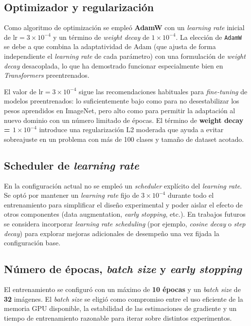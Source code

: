 \subsection{Optimizador y regularización}

Como algoritmo de optimización se empleó \textbf{AdamW} con un \textit{learning rate} inicial de $\text{lr} = 3 \times 10^{-4}$ y un término de \textit{weight decay} de $1 \times 10^{-4}$. La elección de \texttt{AdamW} se debe a que combina la adaptatividad de Adam (que ajusta de forma independiente el \textit{learning rate} de cada parámetro) con una formulación de \textit{weight decay} desacoplada, lo que ha demostrado funcionar especialmente bien en \textit{Transformers} preentrenados.

El valor de $\text{lr} = 3 \times 10^{-4}$ sigue las recomendaciones habituales para \textit{fine-tuning} de modelos preentrenados: lo suficientemente bajo como para no desestabilizar los pesos aprendidos en ImageNet, pero alto como para permitir la adaptación al nuevo dominio con un número limitado de épocas. El término de \textbf{weight decay = $1 \times 10^{-4}$} introduce una regularización L2 moderada que ayuda a evitar sobreajuste en un problema con más de 100 clases y tamaño de dataset acotado.

\subsection{Scheduler de \textit{learning rate}}

En la configuración actual no se empleó un \textit{scheduler} explícito del \textit{learning rate}. Se optó por mantener un \textit{learning rate} fijo de $3 \times 10^{-4}$ durante todo el entrenamiento para simplificar el diseño experimental y poder aislar el efecto de otros componentes (data augmentation, \textit{early stopping}, etc.). En trabajos futuros se considera incorporar \textit{learning rate scheduling} (por ejemplo, \textit{cosine decay} o \textit{step decay}) para explorar mejoras adicionales de desempeño una vez fijada la configuración base.

\subsection{Número de épocas, \textit{batch size} y \textit{early stopping}}

El entrenamiento se configuró con un máximo de \textbf{10 épocas} y un \textit{batch size} de \textbf{32} imágenes. El \textit{batch size} se eligió como compromiso entre el uso eficiente de la memoria GPU disponible, la estabilidad de las estimaciones de gradiente y un tiempo de entrenamiento razonable para iterar sobre distintos experimentos.

